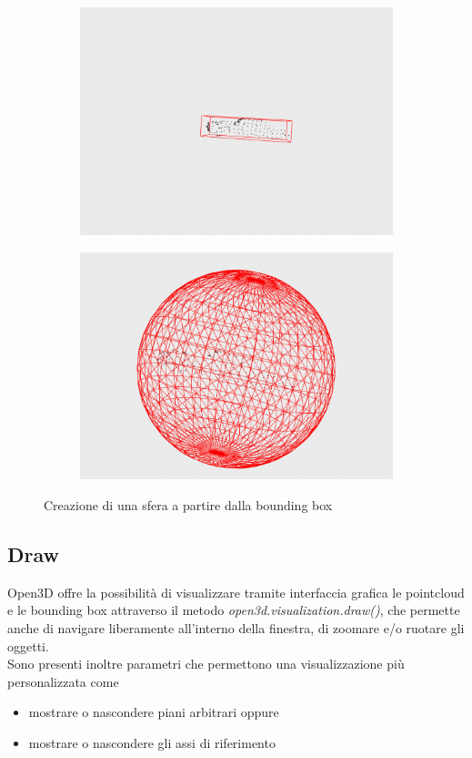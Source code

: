 \documentclass[italian]{report}
\begin{document}
\begin{figure}[H]
	\centering
	\begin{subfigure}{0.45\textwidth}
		\includegraphics[width=\textwidth]{notExpandedBox}
	\end{subfigure}
	\begin{subfigure}{0.45\textwidth}
		\includegraphics[width=\textwidth]{Sphere}
	\end{subfigure}
	\footnotesize
	\caption{Creazione di una sfera a partire dalla bounding box}
\end{figure}
\subsection{Draw}
Open3D offre la possibilità di visualizzare tramite interfaccia grafica le pointcloud e le bounding box attraverso il metodo \textit{open3d.visualization.draw()}, che permette anche di navigare liberamente all'interno della finestra, di zoomare e/o ruotare gli oggetti.\\
Sono presenti inoltre parametri che permettono una visualizzazione più personalizzata come
\begin{itemize}
	\item mostrare o nascondere piani arbitrari oppure
	\item mostrare o nascondere gli assi di riferimento
\end{itemize}
\end{document}
